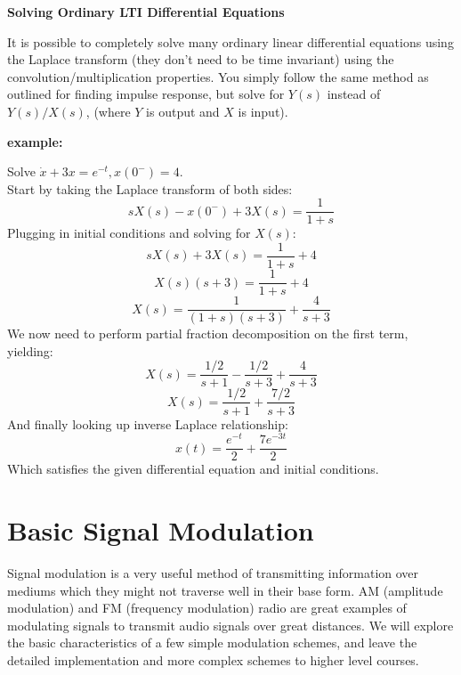 \documentclass[a4paper]{article}
\numberwithin{equation}{section}
\begin{document}
\textbf{Solving Ordinary LTI Differential Equations}

It is possible to completely solve many ordinary linear differential equations using the Laplace transform (they don't need to be time invariant) using the convolution/multiplication properties. You simply follow the same method as outlined for finding impulse response, but solve for $Y(s)$ instead of $Y(s)/X(s)$, (where $Y$ is output and $X$ is input).

\textbf{example:}

Solve $\dot{x}+3x=e^{-t}, x(0^-)=4$.\\

Start by taking the Laplace transform of both sides:
\begin{equation}
sX(s)-x(0^-)+3X(s)=\frac{1}{1+s}
\end{equation}
Plugging in initial conditions and solving for $X(s)$:
\begin{equation}
sX(s)+3X(s)=\frac{1}{1+s}+4
\end{equation}
\begin{equation}
X(s)(s+3)=\frac{1}{1+s}+4
\end{equation}
\begin{equation}
X(s)=\frac{1}{(1+s)(s+3)}+\frac{4}{s+3}
\end{equation}
We now need to perform partial fraction decomposition on the first term, yielding:
\begin{equation}
X(s)=\frac{1/2}{s+1}-\frac{1/2}{s+3}+\frac{4}{s+3}
\end{equation}
\begin{equation}
X(s)=\frac{1/2}{s+1}+\frac{7/2}{s+3}
\end{equation}
And finally looking up inverse Laplace relationship:
\begin{equation}
x(t)=\frac{e^{-t}}{2}+\frac{7e^{-3t}}{2}
\end{equation}
Which satisfies the given differential equation and initial conditions. 


\section{Basic Signal Modulation}
Signal modulation is a very useful method of transmitting information over mediums which they might not traverse well in their base form. AM (amplitude modulation) and FM (frequency modulation) radio are great examples of modulating signals to transmit audio signals over great distances. We will explore the basic characteristics of a few simple modulation schemes, and leave the detailed implementation and more complex schemes to higher level courses. 
\end{document}
